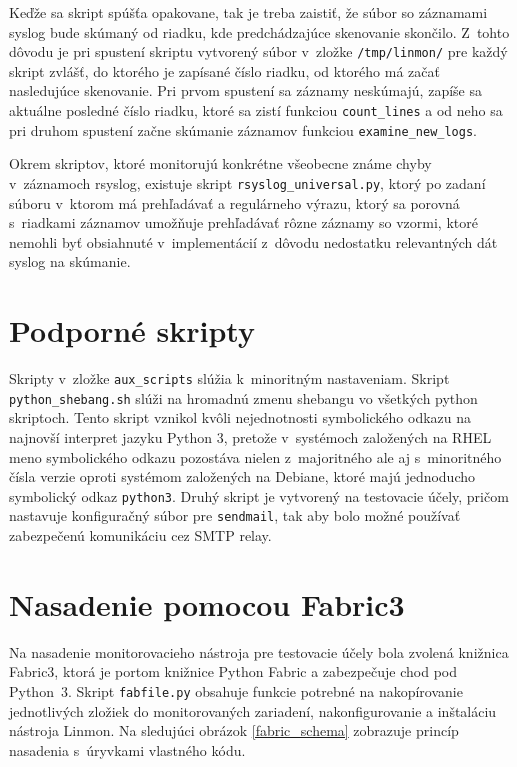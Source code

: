 Keďže sa skript spúšťa opakovane, tak je treba zaistiť, že súbor so záznamami syslog bude skúmaný od riadku, kde predchádzajúce skenovanie skončilo. Z~tohto dôvodu je pri spustení skriptu vytvorený súbor v~zložke \texttt{/tmp/linmon/} pre každý skript zvlášť, do ktorého je zapísané číslo riadku, od ktorého má začať nasledujúce skenovanie. Pri prvom spustení sa záznamy neskúmajú, zapíše sa aktuálne posledné číslo riadku, ktoré sa zistí funkciou \texttt{count\_lines} a od neho sa pri druhom spustení začne skúmanie záznamov funkciou \texttt{examine\_new\_logs}.

Okrem skriptov, ktoré monitorujú konkrétne všeobecne známe chyby v~záznamoch rsyslog, existuje skript \texttt{rsyslog\_universal.py}, ktorý po zadaní súboru v~ktorom má prehľadávať a regulárneho výrazu, ktorý sa porovná s~riadkami záznamov umožňuje prehľadávať rôzne záznamy so vzormi, ktoré nemohli byť obsiahnuté v~implementácií z~dôvodu nedostatku relevantných dát syslog na skúmanie.
\section{Podporné skripty} 
Skripty v~zložke \texttt{aux\_scripts} slúžia k~minoritným nastaveniam. Skript \texttt{python\_shebang.sh} slúži na hromadnú zmenu shebangu vo všetkých python skriptoch. Tento skript vznikol kvôli nejednotnosti symbolického odkazu na najnovší interpret jazyku Python 3, pretože v~systémoch založených na RHEL meno symbolického odkazu pozostáva nielen z~majoritného ale aj s~minoritného čísla verzie oproti systémom založených na Debiane, ktoré majú jednoducho symbolický odkaz \texttt{python3}. Druhý skript je vytvorený na testovacie účely, pričom nastavuje konfiguračný súbor pre \texttt{sendmail}, tak aby bolo možné používať zabezpečenú komunikáciu cez SMTP relay.

\section{Nasadenie pomocou Fabric3}
Na nasadenie monitorovacieho nástroja pre testovacie účely bola zvolená knižnica \hbox{Fabric3}, ktorá je portom knižnice Python Fabric a zabezpečuje chod pod \hbox{Python 3}. Skript \texttt{fabfile.py} obsahuje funkcie potrebné na nakopírovanie jednotlivých zložiek do monitorovaných zariadení, nakonfigurovanie a inštaláciu nástroja Linmon. Na sledujúci obrázok \ref{fabric_schema} zobrazuje princíp nasadenia s~úryvkami vlastného kódu.

